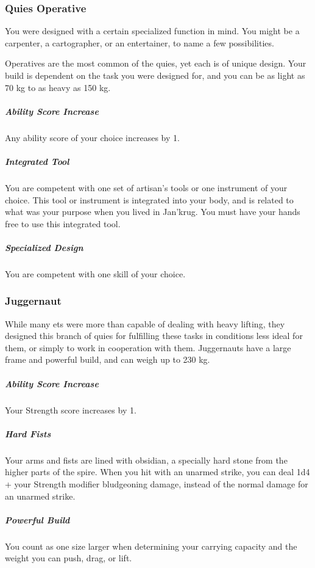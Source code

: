 \subsubsection{Quies Operative}
You were designed with a certain specialized function in mind.
You might be a carpenter, a cartographer, or an entertainer, to name a few possibilities.

Operatives are the most common of the quies, yet each is of unique design.
Your build is dependent on the task you were designed for, and you can be as light as 70 kg to as heavy as 150 kg.

\subparagraph{Ability Score Increase} Any ability score of your choice increases by 1.

\subparagraph{Integrated Tool} You are competent with one set of artisan's tools or one instrument of your choice.
This tool or instrument is integrated into your body, and is related to what was your purpose when you lived in Jan'krug.
You must have your hands free to use this integrated tool.

\subparagraph{Specialized Design} You are competent with one skill of your choice.

\subsubsection{Juggernaut}
While many ets were more than capable of dealing with heavy lifting, they designed this branch of quies for fulfilling these tasks in conditions less ideal for them, or simply to work in cooperation with them.
Juggernauts have a large frame and powerful build, and can weigh up to 230 kg.

\subparagraph{Ability Score Increase} Your Strength score increases by 1.

\subparagraph{Hard Fists} Your arms and fists are lined with obsidian, a specially hard stone from the higher parts of the spire.
When you hit with an unarmed strike, you can deal 1d4 + your Strength modifier bludgeoning damage, instead of the normal damage for an unarmed strike.

\subparagraph{Powerful Build} You count as one size larger when determining your carrying capacity and the weight you can push, drag, or lift.

